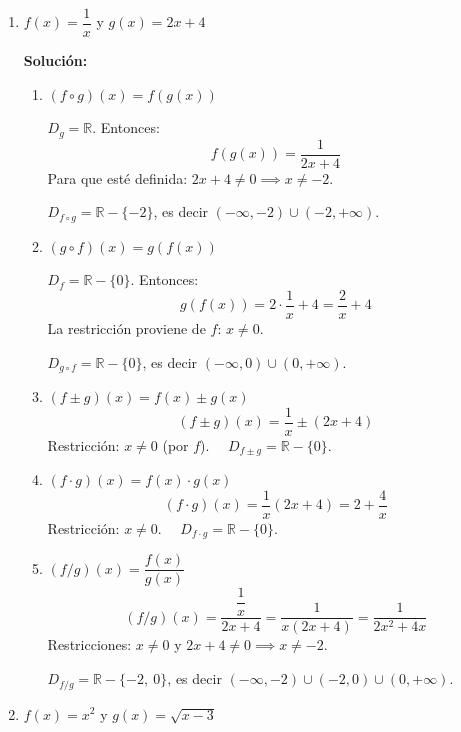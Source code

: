 \documentclass[12pt]{article}
\begin{document}
\begin{enumerate}[label=\alph*.-]
 
    \item $f(x) = \dfrac{1}{x}$ \quad y \quad $g(x) = 2x + 4$
    
    \textbf{Solución:}
 
    \begin{enumerate}[label=\roman*.]
        \item \textbf{$(f \circ g)(x) = f(g(x))$}
        
        $D_g = \mathbb{R}$. Entonces:
        \[
        f(g(x)) = \frac{1}{2x + 4}
        \]
        Para que esté definida: $2x + 4 \neq 0 \implies x \neq -2$.
        
        $D_{f \circ g} = \mathbb{R} - \{-2\}$, es decir $(-\infty, -2) \cup (-2, +\infty)$.
 
        \item \textbf{$(g \circ f)(x) = g(f(x))$}
        
        $D_f = \mathbb{R} - \{0\}$. Entonces:
        \[
        g(f(x)) = 2\cdot\frac{1}{x} + 4 = \frac{2}{x} + 4
        \]
        La restricción proviene de $f$: $x \neq 0$.
        
        $D_{g \circ f} = \mathbb{R} - \{0\}$, es decir $(-\infty, 0) \cup (0, +\infty)$.
 
        \item \textbf{$(f \pm g)(x) = f(x) \pm g(x)$}
        \[
        (f \pm g)(x) = \frac{1}{x} \pm (2x + 4)
        \]
        Restricción: $x \neq 0$ (por $f$). $\quad D_{f \pm g} = \mathbb{R} - \{0\}$.
 
        \item \textbf{$(f \cdot g)(x) = f(x) \cdot g(x)$}
        \[
        (f \cdot g)(x) = \frac{1}{x}(2x + 4) = 2 + \frac{4}{x}
        \]
        Restricción: $x \neq 0$. $\quad D_{f \cdot g} = \mathbb{R} - \{0\}$.
 
        \item \textbf{$(f/g)(x) = \dfrac{f(x)}{g(x)}$}
        \[
        (f/g)(x) = \frac{\dfrac{1}{x}}{2x + 4} = \frac{1}{x(2x+4)} = \frac{1}{2x^2 + 4x}
        \]
        Restricciones: $x \neq 0$ y $2x + 4 \neq 0 \implies x \neq -2$.
        
        $D_{f/g} = \mathbb{R} - \{-2,\ 0\}$, es decir $(-\infty, -2) \cup (-2, 0) \cup (0, +\infty)$.
    \end{enumerate}
 
    \item $f(x) = x^2$ \quad y \quad $g(x) = \sqrt{x - 3}$
    

\end{enumerate}
\end{document}
